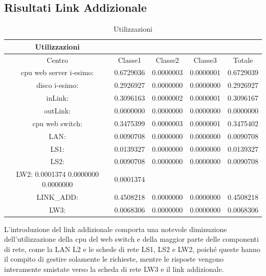 \subsection{Risultati Link Addizionale}
\begin{table}[htbp]
\begin{center}
\begin{tabular}{|c|c|c|c|c|}
\hline
Utilizzazioni\\
\hline
Centro &Classe1 &Classe2 &Classe3 &Totale\\
\hline
\hline
 cpu web server i-esimo: 	&0.6729036	&0.0000003	&0.0000001	&0.6729039\\
\hline
 disco i-esimo: 	&0.2926927	&0.0000000	&0.0000000	&0.2926927\\
\hline
 inLink: 	&0.3096163	&0.0000002	&0.0000001	&0.3096167\\
\hline
 outLink: 	&0.0000000	&0.0000000	&0.0000000	&0.0000000\\
\hline
 cpu web switch: 	&0.3475399	&0.0000003	&0.0000001	&0.3475402\\
\hline
 LAN: 	&0.0090708	&0.0000000	&0.0000000	&0.0090708\\
\hline
 LS1: 	&0.0139327	&0.0000000	&0.0000000	&0.0139327\\
\hline
 LS2:	&0.0090708	&0.0000000	&0.0000000	&0.0090708\\
\hline
 LW2: 	0.0001374	0.0000000	0.0000000	&0.0001374\\
\hline
 LINK_ADD: 	&0.4508218	&0.0000000	&0.0000000	&0.4508218\\
\hline
 LW3: 	&0.0068306	&0.0000000	&0.0000000	&0.0068306\\
\hline
\end{tabular}
\end{center}
\caption{Utilizzazioni}
\label{utilizzazioni}
\end{table}
L'introduzione del link addizionale comporta una notevole diminuzione dell'utilizzazione della cpu del web switch e  della maggior parte delle componenti di rete, come la LAN L2 e le schede di rete LS1, LS2 e LW2, poiché queste hanno il compito di gestire solamente le richieste, mentre le risposte  vengono interamente smistate verso la scheda di rete LW3 e il link addizionale.
